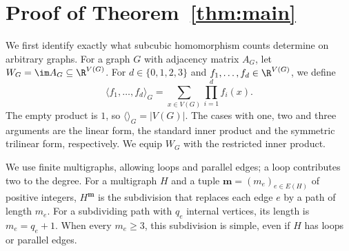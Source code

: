\section{Proof of Theorem~\ref{thm:main}}
\label{sec:characterisation}

We first identify exactly what subcubic homomorphism counts determine
on arbitrary graphs.
For a graph $G$ with adjacency matrix $A_G$, let
$W_G=\im A_G\subseteq\R^{V(G)}$.
For $d\in\{0,1,2,3\}$ and $f_1,\ldots,f_d\in\R^{V(G)}$, we define
\begin{equation}\label{eq:image-trilinear}
 \langle f_1,\ldots,f_d\rangle_G
 =\sum_{x\in V(G)}\prod_{i=1}^{d}f_i(x).
\end{equation}
The empty product is $1$, so $\langle\rangle_G=|V(G)|$.
The cases with one, two and three arguments are the linear form,
the standard inner product and the symmetric trilinear form, respectively.
We equip $W_G$ with the restricted inner product.

We use finite multigraphs, allowing loops and parallel edges; a loop
contributes two to the degree. For a multigraph $H$ and a tuple
$\mathbf m=(m_e)_{e\in E(H)}$ of positive integers, $H^{\mathbf m}$
is the subdivision that replaces each edge $e$ by a path of length $m_e$.
For a subdividing path with $q_e$ internal vertices, its length is $m_e=q_e+1$.
When every $m_e\geq3$, this subdivision is simple, even if $H$ has loops
or parallel edges.

